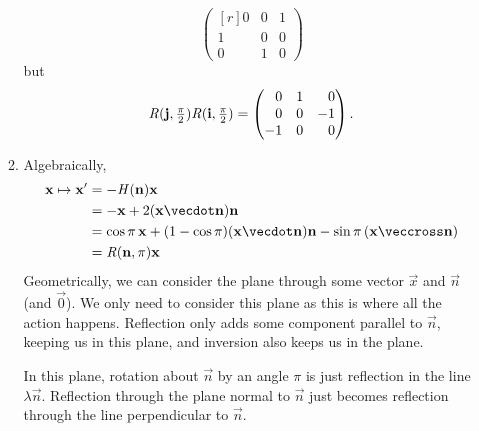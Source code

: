 \documentclass[fleqn,a4paper,11pt]{article}
\begin{document}
\begin{enumerate}[label=\textbf{\arabic*.}]
\begin{enumerate}[label=(\alph*)]
\begin{equation*}
\begin{pmatrix*}[r]
         0 & 0 & 1 \\
         1 & 0 & 0 \\
         0 & 1 & 0
        \end{pmatrix*}
      \end{equation*}
      but
      \begin{equation*}
       \mat R(\vec j, \tfrac \pi 2)\mat R(\vec i, \tfrac \pi 2)
        =
        \begin{pmatrix*}[r]
         0 & 1 & 0 \\
         0 & 0 & -1 \\
         -1 & 0 & 0
        \end{pmatrix*}.
      \end{equation*}
     \item
      Algebraically,
      \begin{align*}
       \vec x \mapsto \vec x'
        &= -\mat H(\vec n) \vec x \\
        &= -\vec x + 2(\vec x \vecdot \vec n) \vec n \\
        &= \cos\pi\,\vec x + (1 - \cos\pi)(\vec x \vecdot \vec n) \vec n
           - \sin \pi\,(\vec x \veccross \vec n) \\
        &= \mat R(\vec n, \pi) \vec x
      \end{align*}
      Geometrically, we can consider the plane through some
      vector \(\vec x\) and \(\vec n\) (and \(\vec 0\)). We only need to
      consider this plane as this is where all the action happens. Reflection
      only adds some component parallel to \(\vec n\), keeping us in this plane,
      and inversion also keeps us in the plane.

      In this plane, rotation about \(\vec n\) by an angle \(\pi\) is just
      reflection in the line \(\lambda \vec n\). Reflection through the plane
      normal to \(\vec n\) just becomes reflection through the line
      perpendicular to \(\vec n\).


\end{enumerate}
\end{enumerate}
\end{document}
